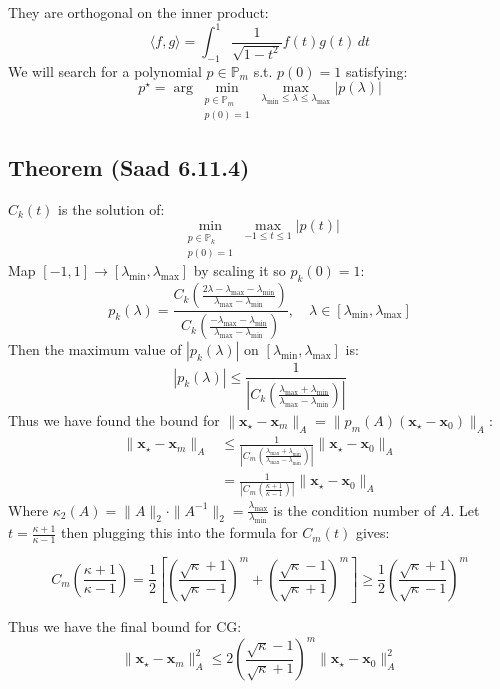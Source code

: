 They are orthogonal on the inner product:
\[
    \langle f, g \rangle = \int_{-1}^1 \frac{1}{\sqrt{1 - t^2}} f(t) g(t) \, dt
\]
We will search for a polynomial $p \in \mathbb{P}_m$ s.t. $p(0) = 1$ satisfying:
\[
    p^\star = \arg\min_{\substack{p \in \mathbb{P}_m \\ p(0) = 1}} \max_{\lambda_{\min} \leq \lambda \leq \lambda_{\max}} |p(\lambda)|
\]

\subsection{Theorem (Saad 6.11.4)}
$C_k(t)$ is the solution of:
\[
    \min_{\substack{p \in \mathbb{P}_k \\ p(0) = 1}} \max_{-1 \leq t \leq 1} |p(t)|
\]
Map $[-1, 1] \to [\lambda_{\min}, \lambda_{\max}]$ by scaling it so $p_k(0) = 1$:
\[
    p_k(\lambda) = \frac{C_k\left(\frac{2\lambda - \lambda_{\max} -\lambda_{\min}}{\lambda_{\max} - \lambda_{\min}}\right)}{C_k\left(\frac{- \lambda_{\max} - \lambda_{\min}}{\lambda_{\max} - \lambda_{\min}}\right)}, \quad \lambda \in [\lambda_{\min}, \lambda_{\max}]
\]
Then the maximum value of $|p_k(\lambda)|$ on $[\lambda_{\min}, \lambda_{\max}]$ is:
\[
    |p_k(\lambda)| \leq \frac{1}{|C_k\left(\frac{\lambda_{\max} + \lambda_{\min}}{\lambda_{\max} - \lambda_{\min}}\right)|}
\]
Thus we have found the bound for $\|\mathbf{x}_{\star} - \mathbf{x}_m\|_A = \|p_m(A) (\mathbf{x}_{\star} - \mathbf{x}_0)\|_A$:
\begin{align*}
    \|\mathbf{x}_{\star} - \mathbf{x}_m\|_A & \leq \frac{1}{|C_m\left(\frac{\lambda_{\max} + \lambda_{\min}}{\lambda_{\max} - \lambda_{\min}}\right)|} \|\mathbf{x}_{\star} - \mathbf{x}_0\|_A \\
                                            & = \frac{1}{|C_m\left(\frac{\kappa + 1}{\kappa - 1}\right)|} \|\mathbf{x}_{\star} - \mathbf{x}_0\|_A
\end{align*}
Where $\kappa_2(A) = \|A\|_2 \cdot \|A^{-1}\|_2 = \frac{\lambda_{\max}}{\lambda_{\min}}$ is the condition number of $A$.
Let $t = \frac{\kappa + 1}{\kappa - 1}$ then plugging this into the formula for $C_m(t)$ gives:

\[
    C_m(\frac{\kappa + 1}{\kappa - 1}) = \frac{1}{2} \left[\left(\frac{\sqrt{\kappa} + 1}{\sqrt{\kappa} - 1}\right)^m + \left(\frac{\sqrt{\kappa} - 1}{\sqrt{\kappa} + 1}\right)^m\right] \geq \frac{1}{2} \left(\frac{\sqrt{\kappa} + 1}{\sqrt{\kappa} - 1}\right)^m
\]

Thus we have the final bound for CG:
\[
    \boxed{\|\mathbf{x}_{\star} - \mathbf{x}_m\|_A^2 \leq 2 \left(\frac{\sqrt{\kappa} - 1}{\sqrt{\kappa} + 1}\right)^m \|\mathbf{x}_{\star} - \mathbf{x}_0\|_A^2}
\]

